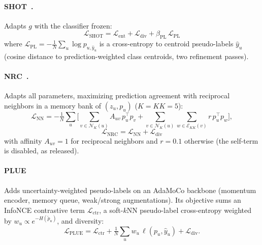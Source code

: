 \documentclass[letterpaper]{article} %
\begin{document}
\paragraph{SHOT~\cite{liang2020we}.} Adapts $g$ with the classifier frozen:
\begin{equation*}
\mathcal{L}_{\mathrm{SHOT}}=\mathcal{L}_{\mathrm{ent}}+\mathcal{L}_{\mathrm{div}}
+\beta_{\mathrm{PL}}\,\mathcal{L}_{\mathrm{PL}}
\end{equation*}
where $\mathcal{L}_{\mathrm{PL}}=-\tfrac1N\sum_u\log p_{u,\hat y_u}$ is a cross-entropy to centroid
pseudo-labels $\hat y_u$ (cosine distance to prediction-weighted class centroids, two refinement
passes).

\paragraph{NRC~\cite{yang2023trust}.} Adapts all parameters, maximizing prediction agreement with reciprocal neighbors in a memory bank of $(z_u,p_u)$ ($K{=}KK{=}5$):
\begin{equation*}
\mathcal{L}_{\mathrm{NN}}=-\tfrac{1}{N}\sum_{u}\Big[
\sum_{v\in\mathcal{N}_K(u)}\!\! A_{uv}\,p_u^{\top}p_v
+\!\!\sum_{v\in\mathcal{N}_K(u)}\sum_{w\in\mathcal{E}_{KK}(v)}\!\! r\,p_u^{\top}p_w\Big],
\end{equation*}
\begin{equation*}
\mathcal{L}_{\mathrm{NRC}}=\mathcal{L}_{\mathrm{NN}}+\mathcal{L}_{\mathrm{div}}
\end{equation*}
with affinity $A_{uv}{=}1$ for reciprocal neighbors and $r{=}0.1$ otherwise (the self-term is
disabled, as released).

\paragraph{PLUE~\cite{litrico2023guiding}} Adds uncertainty-weighted pseudo-labels on an AdaMoCo backbone (momentum encoder, memory queue, weak/strong augmentations). Its objective sums an InfoNCE contrastive term $\mathcal{L}_{\mathrm{ctr}}$, a soft-$k$NN pseudo-label cross-entropy weighted by
$w_u\propto e^{-H(\tilde p_u)}$, and diversity:
\begin{equation*}
\mathcal{L}_{\mathrm{PLUE}}=\mathcal{L}_{\mathrm{ctr}}
+\tfrac{1}{N}\sum_{u} w_u\,\ell(p_u,\hat y_u)+\mathcal{L}_{\mathrm{div}}.
\end{equation*}
\end{document}
